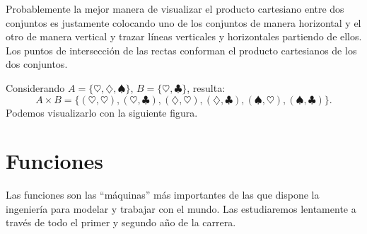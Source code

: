 Probablemente la mejor manera de visualizar el producto cartesiano entre dos conjuntos es justamente colocando uno de los conjuntos de manera horizontal y el otro de manera vertical y trazar líneas verticales y horizontales partiendo de ellos. Los puntos de intersección de las rectas conforman el producto cartesianos de los dos conjuntos.

\vspace{.2cm}


\begin{ejemplo}
Considerando $A=\{\heartsuit,\diamondsuit,\spadesuit\}$, $B=\{\heartsuit,\clubsuit\}$, resulta:
$$A\times B=\{(\heartsuit,\heartsuit),(\heartsuit,\clubsuit),(\diamondsuit,\heartsuit),(\diamondsuit,\clubsuit),(\spadesuit,\heartsuit),(\spadesuit,\clubsuit)\}.$$
Podemos visualizarlo con la siguiente figura.
\vspace{.5cm}
\begin{center}
\end{center}
\end{ejemplo}


\section{Funciones}

Las funciones son las ``máquinas'' más importantes de las que dispone la ingeniería para modelar y trabajar con el mundo. 
Las estudiaremos lentamente a través de todo el primer y segundo año de la carrera.

\vspace{.2cm}


